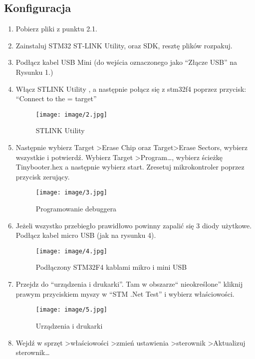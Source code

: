 \documentclass{article}
\begin{document}
\subsection{Konfiguracja}
\begin{enumerate}
\item Pobierz pliki z punktu 2.1.
\item Zainstaluj STM32 ST-LINK Utility, oraz SDK, resztę plików rozpakuj.
\item Podłącz kabel USB Mini (do wejścia oznaczonego jako “Złącze USB” na Rysunku 1.)
\item Włącz STLINK Utility , a następnie połącz się z stm32f4 poprzez przycisk: “Connect to the = target”

\begin{figure}[H]
\texttt{[image: image/2.jpg]}
\caption{STLINK Utility}
\end{figure}

\item Następnie wybierz Target \textgreater Erase Chip oraz Target\textgreater Erase Sectors, wybierz wszystkie i potwierdź. Wybierz Target \textgreater Program…, wybierz ścieżkę Tinybooter.hex a następnie wybierz start. Zresetuj mikrokontroler poprzez przycisk zerujący.

\begin{figure}[H]
\texttt{[image: image/3.jpg]}
\caption{Programowanie debuggera}
\end{figure}

\item Jeżeli wszystko przebiegło prawidłowo powinny zapalić się 3 diody użytkowe. Podłącz kabel micro USB (jak na rysunku 4).

\begin{figure}[H]
\texttt{[image: image/4.jpg]}
\caption{Podłączony STM32F4 kablami mikro i mini USB}
\end{figure}

\item Przejdz do “urządzenia i drukarki”. Tam w obszarze“ nieokreślone” kliknij prawym przyciskiem myszy w “STM .Net Test” i wybierz właściowości.

\begin{figure}[H]
\texttt{[image: image/5.jpg]}
\caption{Urządzenia i drukarki}
\end{figure}

\item Wejdź w sprzęt \textgreater właściowości \textgreater zmień ustawienia \textgreater sterownik \textgreater Aktualizuj sterownik…


\end{enumerate}
\end{document}
